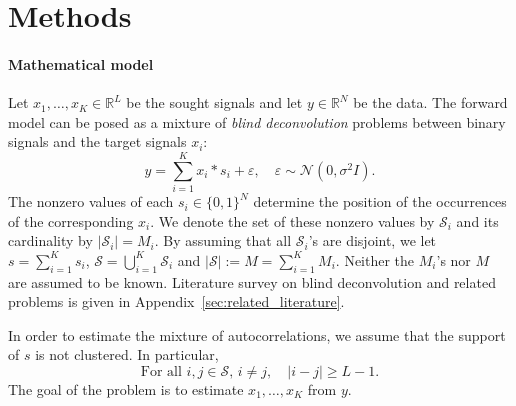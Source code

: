 \documentclass[english,11pt]{article}
\numberwithin{equation}{section}
\theoremstyle{plain}
\theoremstyle{definition}
\theoremstyle{remark}
\theoremstyle{plain}
\theoremstyle{remark}
\theoremstyle{plain}
\theoremstyle{plain}
\newcommand{\RL}{\mathbb{R}^L}
\newcommand{\RN}{\mathbb{R}^N}
\begin{document}


\section{Methods} \label{sec:methods}


\paragraph{Mathematical model}

Let $x_1,\ldots,x_K\in\RL$ be the sought signals and let $y\in\RN$ be the data. 
The forward model can be posed as a mixture of \emph{blind deconvolution} problems between binary signals and the target signals $x_i$:
\begin{equation} \label{eq:model}
y = \sum_{i=1}^K x_i\ast s_i + \varepsilon,\quad \varepsilon\sim\mathcal{N}(0,\sigma^2 I).
\end{equation}
The nonzero values of each  $s_i\in\{0,1\}^N$ determine the position of the occurrences of the corresponding $x_i$. 
We denote the set of these nonzero values by 
 $\mathcal{S}_i$ and its cardinality by $\vert \mathcal{S}_i\vert = M_i$. 
By assuming that all $\mathcal{S}_i$'s are disjoint,  we let $s = \sum_{i=1}^Ks_i$, $\mathcal{S} = \bigcup_{i=1}^{K} \mathcal{S}_i$ and  $\vert \mathcal{S}\vert :=M =  \sum_{i=1}^{K}M_i$.  Neither the $M_i$'s nor $M$ are assumed to be known. Literature survey on blind deconvolution and related problems is given in Appendix~\ref{sec:related_literature}.

In order to estimate the mixture of autocorrelations, we assume that the support of $s$ is not clustered. In particular,
\begin{equation} \label{eq:spacing}
\text{For all }  i,j\in\mathcal{S}, \, i\neq j,  \quad  \vert i-j \vert\geq L-1.  
\end{equation}
The goal of the problem is to estimate $x_1,\ldots,x_K$ from $y$.
\end{document}
